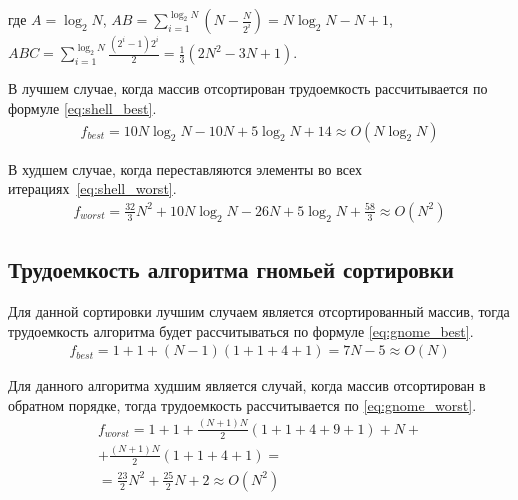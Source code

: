 где $ A = \log_{2}N $, $AB = \sum_{i=1}^{\log_{2}N}(N - \frac{N}{2^i}) = N \log_{2}N - N + 1$, $ABC = \sum_{i=1}^{\log_{2}N} \frac{(2^i-1)2^i}{2} = \frac{1}{3}(2N^2-3N+1)$.

В лучшем случае, когда массив отсортирован трудоемкость рассчитывается по формуле \eqref{eq:shell_best}.
\begin{equation}
	\label{eq:shell_best}
	\begin{gathered}
		f_{best} = 10 N \log_{2}N - 10 N + 5 \log_{2}N + 14 \approx O(N\log_{2}N)
	\end{gathered}
\end{equation}

В худшем случае, когда переставляются элементы во всех итерациях~\eqref{eq:shell_worst}.
\begin{equation}
	\label{eq:shell_worst}
	\begin{gathered}
		f_{worst} = \frac{32}{3}N^2 + 10 N \log_{2}N - 26 N + 5 \log_{2}N + \frac{58}{3} \approx O(N^2)
	\end{gathered}
\end{equation}

\subsection{Трудоемкость алгоритма гномьей сортировки}

Для данной сортировки лучшим случаем является отсортированный массив, тогда трудоемкость алгоритма будет рассчитываться по формуле \eqref{eq:gnome_best}.
\begin{equation}
	\label{eq:gnome_best}
	\begin{gathered}
		f_{best} = 1 + 1 + (N - 1)(1 + 1 + 4 + 1) = 7 N - 5 \approx O(N)
	\end{gathered}
\end{equation}

Для данного алгоритма худшим является случай, когда массив отсортирован в обратном порядке, тогда трудоемкость рассчитывается по \eqref{eq:gnome_worst}.
\begin{equation}
	\label{eq:gnome_worst}
	\begin{gathered}
		f_{worst} = 1 + 1 + \frac{(N + 1)N}{2}(1 + 1 + 4 + 9 + 1) + N + \\
		+ \frac{(N + 1)N}{2}(1 + 1 + 4 + 1) = 
		\\ = \frac{23}{2} N^2 + \frac{25}{2}N + 2 \approx O(N^2)
	\end{gathered}
\end{equation}

